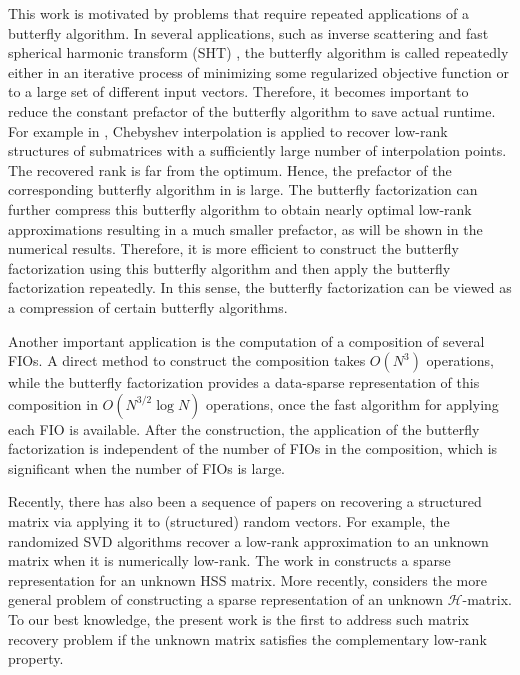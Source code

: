 This work is motivated by problems that require repeated applications of a butterfly algorithm. In several applications, such as inverse scattering \cite{InvRadon,InvFIO} and fast spherical harmonic transform ({SHT}) \cite{Special2}, the butterfly algorithm is called repeatedly either in an iterative process of minimizing some regularized objective function or to a large set of different input vectors. Therefore, it becomes important to reduce the constant prefactor of the butterfly algorithm to save actual runtime. For example in \cite{FIO09}, {Chebyshev} interpolation is applied to recover low-rank structures of submatrices with a sufficiently large number of interpolation points. The recovered rank is far from the optimum. Hence, the prefactor of the corresponding butterfly algorithm in \cite{FIO09} is large. The butterfly factorization can further compress this butterfly algorithm to obtain nearly optimal low-rank approximations resulting in a much smaller prefactor, as will be shown in the numerical results. Therefore, it is more efficient to construct the butterfly factorization using this butterfly algorithm and then apply the butterfly factorization repeatedly. In this sense, the butterfly factorization can be viewed as a compression of certain butterfly algorithms.

Another important application is the computation of a composition of several {FIOs}. A direct method to construct the composition takes $O(N^3)$ operations, while the butterfly factorization provides a data-sparse representation of this composition in $O(N^{3/2}\log N)$ operations, once the fast algorithm for applying each {FIO} is available. After the construction, the application of the butterfly factorization is independent of the number of {FIOs} in the composition, which is significant when the number of {FIOs} is large.

Recently, there has also been a sequence of papers on recovering a structured matrix via applying it to (structured) random vectors. For example, the randomized SVD algorithms \cite{Rec1,Rec2,Rec3} recover a low-rank approximation to an unknown matrix when it is numerically low-rank. The work in \cite{HSSMatrix} constructs a sparse representation for an unknown {HSS} matrix. More recently, \cite{HMatrix} considers the more general problem of constructing a sparse representation of an unknown
$\mathcal{H}$-matrix. To our best knowledge, the present work is the first to address such matrix recovery problem if the unknown matrix satisfies the complementary low-rank property.

